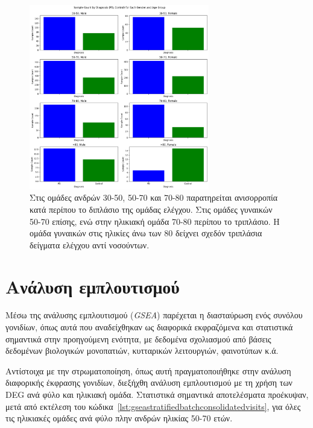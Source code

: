 \documentclass[12pt]{report}
\begin{document}
            \begin{figure}[H]
                \centering
                \includegraphics[width=0.7\textwidth]{ML/ppmi-visual-bar-class-imb.png}
                \caption[Απεικόνιση ανισορροπίας μεταξύ των ομάδων της μελέτης] {Στις ομάδες ανδρών 30-50, 50-70 και 70-80 παρατηρείται ανισορροπία κατά περίπου το διπλάσιο της ομάδας ελέγχου. Στις ομάδες γυναικών 50-70 επίσης, ενώ στην ηλικιακή ομάδα 70-80 περίπου το τριπλάσιο. Η ομάδα γυναικών στις ηλικίες άνω των 80 δείχνει σχεδόν τριπλάσια δείγματα ελέγχου αντί νοσούντων.}
                \label{fig:ppmi-visual-bar-class-imb}
            \end{figure}
    \section{Ανάλυση εμπλουτισμού}
        \par 
            Μέσω της ανάλυσης εμπλουτισμού (\emph{GSEA}) παρέχεται η διασταύρωση ενός συνόλου γονιδίων, όπως αυτά που αναδείχθηκαν ως διαφορικά εκφραζόμενα και στατιστικά σημαντικά στην προηγούμενη ενότητα, με δεδομένα σχολιασμού από βάσεις δεδομένων βιολογικών μονοπατιών, κυτταρικών λειτουργιών, φαινοτύπων κ.ά.
        \par
            Αντίστοιχα με την στρωματοποίηση, όπως αυτή πραγματοποιήθηκε στην ανάλυση διαφορικής έκφρασης γονιδίων, διεξήχθη ανάλυση εμπλουτισμού με τη χρήση των DEG ανά φύλο και ηλικιακή ομάδα. Στατιστικά σημαντικά αποτελέσματα προέκυψαν, μετά από εκτέλεση του κώδικα~\ref{lst:gseastratifiedbatchconsolidatedvisits}, για όλες τις ηλικιακές ομάδες ανά φύλο πλην ανδρών ηλικίας 50-70 ετών.
            
\end{document}
